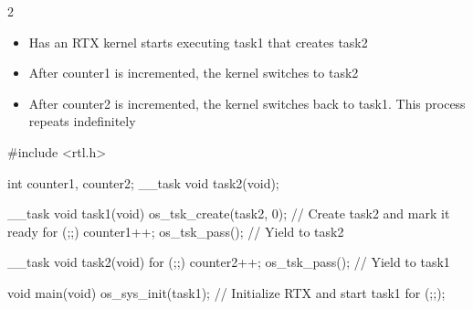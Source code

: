 \documentclass[a4paper,11pt]{article}
\begin{document}
\Needspace{64pt}
\begin{multicols}{2}
\begin{itemize}
\item \begin{minipage}[t]{\linewidth}Has an RTX kernel starts executing task1 that creates task2\end{minipage}
\item \begin{minipage}[t]{\linewidth}After counter1 is incremented, the kernel switches to task2\end{minipage}
\item \begin{minipage}[t]{\linewidth}After counter2 is incremented, the kernel switches back to task1. This process repeats indefinitely\end{minipage}
\end{itemize}
\end{multicols}



\Needspace{329pt}



\begin{minipage}{\linewidth}
\begin{notecode}[language=C,basicstyle=\fontsize{9.5}{11}\selectfont\ttfamily\color{NoteInk}]
#include <rtl.h>

int counter1, counter2;
__task void task2(void);

__task void task1(void) {
    os_tsk_create(task2, 0);  // Create task2 and mark it ready
    for (;;) {
        counter1++;
        os_tsk_pass();       // Yield to task2
    }
}

__task void task2(void) {
    for (;;) {
        counter2++;
        os_tsk_pass();       // Yield to task1
    }
}

void main(void) {
    os_sys_init(task1);      // Initialize RTX and start task1
    for (;;);
}
\end{notecode}
\end{minipage}



\Needspace{483pt}
\end{document}
